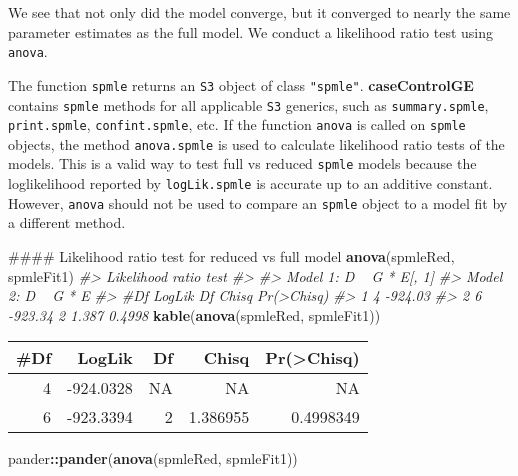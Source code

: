 \documentclass[11pt,]{article}
\newenvironment{Shaded}{\begin{snugshade}}{\end{snugshade}}
\newcommand{\KeywordTok}[1]{\textcolor[rgb]{0.13,0.29,0.53}{\textbf{#1}}}
\newcommand{\CommentTok}[1]{\textcolor[rgb]{0.56,0.35,0.01}{\textit{#1}}}
\newcommand{\OperatorTok}[1]{\textcolor[rgb]{0.81,0.36,0.00}{\textbf{#1}}}
\newcommand{\NormalTok}[1]{#1}
\begin{document}
We see that not only did the model converge, but it converged to nearly
the same parameter estimates as the full model. We conduct a likelihood
ratio test using \texttt{anova}.

The function \texttt{spmle} returns an \texttt{S3} object of class
\texttt{"spmle"}. \textbf{caseControlGE} contains \texttt{spmle} methods
for all applicable \texttt{S3} generics, such as \texttt{summary.spmle},
\texttt{print.spmle}, \texttt{confint.spmle}, etc. If the function
\texttt{anova} is called on \texttt{spmle} objects, the method
\texttt{anova.spmle} is used to calculate likelihood ratio tests of the
models. This is a valid way to test full vs reduced \texttt{spmle}
models because the loglikelihood reported by \texttt{logLik.spmle} is
accurate up to an additive constant. However, \texttt{anova} should not
be used to compare an \texttt{spmle} object to a model fit by a
different method.

\begin{Shaded}
\begin{Highlighting}[]
\NormalTok{#### Likelihood ratio test for reduced vs full model}
\KeywordTok{anova}\NormalTok{(spmleRed, spmleFit1)}
\CommentTok{#> Likelihood ratio test}
\CommentTok{#> }
\CommentTok{#> Model 1: D ~ G * E[, 1]}
\CommentTok{#> Model 2: D ~ G * E}
\CommentTok{#>   #Df  LogLik Df Chisq Pr(>Chisq)}
\CommentTok{#> 1   4 -924.03                    }
\CommentTok{#> 2   6 -923.34  2 1.387     0.4998}
\KeywordTok{kable}\NormalTok{(}\KeywordTok{anova}\NormalTok{(spmleRed, spmleFit1))}
\end{Highlighting}
\end{Shaded}

\begin{longtable}[]{@{}rrrrr@{}}
\toprule
\#Df & LogLik & Df & Chisq & Pr(\textgreater{}Chisq)\tabularnewline
\midrule
\endhead
4 & -924.0328 & NA & NA & NA\tabularnewline
6 & -923.3394 & 2 & 1.386955 & 0.4998349\tabularnewline
\bottomrule
\end{longtable}

\begin{Shaded}
\begin{Highlighting}[]
\NormalTok{pander}\OperatorTok{::}\KeywordTok{pander}\NormalTok{(}\KeywordTok{anova}\NormalTok{(spmleRed, spmleFit1))}
\end{Highlighting}
\end{Shaded}
\end{document}
